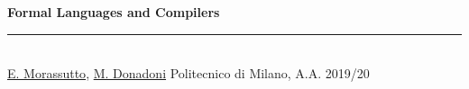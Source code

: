 




\raggedright
\footnotesize
\begin{multicols}{3}

\setlength{\premulticols}{1pt}
\setlength{\postmulticols}{1pt}
\setlength{\multicolsep}{1pt}
\setlength{\columnsep}{2pt}

{\Large{\textbf{Formal Languages and Compilers}}}































\rule{0.3\linewidth}{0.25pt}
\scriptsize\\
\href{mailto:edoardo.morassutto@mail.polimi.it}{E. Morassutto},
\href{mailto:marco.donadoni@mail.polimi.it}{M. Donadoni}
Politecnico di Milano, A.A. 2019/20
\vfill\null
\columnbreak
\vfill\null
\columnbreak
\vfill\null
\columnbreak
\end{multicols}

